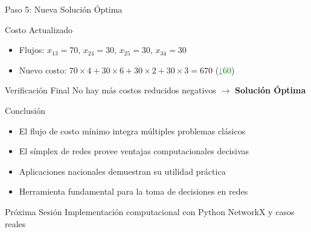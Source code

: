 \documentclass{beamer}
\begin{document}
\begin{frame}{Paso 5: Nueva Solución Óptima}
\centering
{}

\begin{block}{Costo Actualizado}
\begin{itemize}
    \item Flujos: $x_{13}=70$, $x_{24}=30$, $x_{25}=30$, $x_{34}=30$
    \item Nuevo costo: $70×4 + 30×6 + 30×2 + 30×3 = 670$ (\textcolor{green}{↓60})
\end{itemize}
\end{block}

\begin{alertblock}{Verificación Final}
No hay más costos reducidos negativos $\rightarrow$ \textbf{Solución Óptima}
\end{alertblock}
\end{frame}

\begin{frame}{Conclusión}
\begin{itemize}
    \item El flujo de costo mínimo integra múltiples problemas clásicos
    \item El símplex de redes provee ventajas computacionales decisivas
    \item Aplicaciones nacionales demuestran su utilidad práctica
    \item Herramienta fundamental para la toma de decisiones en redes
\end{itemize}

\begin{alertblock}{Próxima Sesión}
Implementación computacional con Python NetworkX y casos reales
\end{alertblock}
\end{frame}
\end{document}
